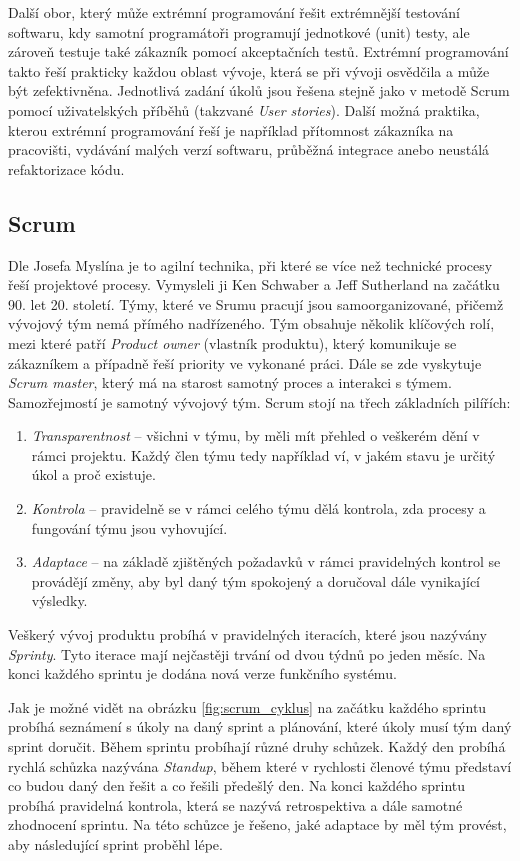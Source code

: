 \documentclass[czech,master]{diploma}
\begin{document}
Další obor, který může extrémní programování řešit extrémnější testování softwaru, kdy samotní programátoři programují jednotkové (unit) testy, ale zároveň testuje také zákazník pomocí akceptačních testů. Extrémní programování takto řeší prakticky každou oblast vývoje, která se při vývoji osvědčila a může být zefektivněna. Jednotlivá zadání úkolů jsou řešena stejně jako v metodě Scrum pomocí uživatelských příběhů (takzvané \textit{User stories}). Další možná praktika, kterou extrémní programování řeší je například přítomnost zákazníka na pracovišti, vydávání malých verzí softwaru, průběžná integrace anebo neustálá refaktorizace kódu.

\subsection{Scrum}
Dle Josefa Myslína \cite{ref:scrum_myslin} je to agilní technika, při které se více než technické procesy řeší projektové procesy. Vymysleli ji Ken Schwaber a Jeff Sutherland na začátku 90. let 20. století. Týmy, které ve Srumu pracují jsou samoorganizované, přičemž vývojový tým nemá přímého nadřízeného. Tým obsahuje několik klíčových rolí, mezi které patří \textit{Product owner} (vlastník produktu), který komunikuje se zákazníkem a případně řeší priority ve vykonané práci. Dále se zde vyskytuje \textit{Scrum master}, který má na starost samotný proces a interakci s týmem. Samozřejmostí je samotný vývojový tým. Scrum stojí na třech základních pilířích:

\begin{enumerate}
\item \textit{Transparentnost} -- všichni v týmu, by měli mít přehled o veškerém dění v rámci projektu. Každý člen týmu tedy například ví, v jakém stavu je určitý úkol a proč existuje.
\item \textit{Kontrola} -- pravidelně se v rámci celého týmu dělá kontrola, zda procesy a fungování týmu jsou vyhovující.
\item \textit{Adaptace} -- na základě zjištěných požadavků v rámci pravidelných kontrol se provádějí změny, aby byl daný tým spokojený a doručoval dále vynikající výsledky.
\end{enumerate}

Veškerý vývoj produktu probíhá v pravidelných iteracích, které jsou nazývány \textit{Sprinty}. Tyto iterace mají nejčastěji trvání od dvou týdnů po jeden měsíc. Na konci každého sprintu je dodána nová verze funkčního systému.

Jak je možné vidět na obrázku \ref{fig:scrum_cyklus} na začátku každého sprintu probíhá seznámení s úkoly na daný sprint a plánování, které úkoly musí tým daný sprint doručit. Během sprintu probíhají různé druhy schůzek. Každý den probíhá rychlá schůzka nazývána \textit{Standup}, během které v rychlosti členové týmu představí co budou daný den řešit a co řešili předešlý den. Na konci každého sprintu probíhá pravidelná kontrola, která se nazývá retrospektiva a dále samotné zhodnocení sprintu. Na této schůzce je řešeno, jaké adaptace by měl tým provést, aby následující sprint proběhl lépe.
\end{document}
